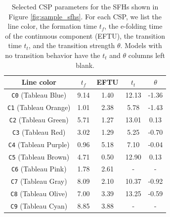 
\begin{table}
    \centering
    \begin{tabular}{||c|c|c|c|c||} \hline \hline
        Line color & $t_f$ & EFTU & $t_t$ & $\theta$ \\ \hline
        \textcolor{mplc0}{\texttt{C0}} (Tableau Blue) & 9.14 & 1.40 & 12.13 & -1.36 \\ \hline
        \textcolor{mplc1}{\texttt{C1}} (Tableau Orange) & 1.01 & 2.38 & 5.78 & -1.43 \\ \hline
        \textcolor{mplc2}{\texttt{C2}} (Tableau Green) & 5.71 & 1.27 & 13.01 & 0.13 \\ \hline
        \textcolor{mplc3}{\texttt{C3}} (Tableau Red) & 3.02 & 1.29 & 5.25 & -0.70 \\ \hline
        \textcolor{mplc4}{\texttt{C4}} (Tableau Purple) & 0.96 & 5.18 & 7.10 & -0.04 \\ \hline
        \textcolor{mplc5}{\texttt{C5}} (Tableau Brown) & 4.71 & 0.50 & 12.90 & 0.13 \\ \hline
        \textcolor{mplc6}{\texttt{C6}} (Tableau Pink) & 1.78 & 2.61 & - & - \\ \hline
        \textcolor{mplc7}{\texttt{C7}} (Tableau Gray) & 8.09 & 2.10 & 10.37 & -0.92 \\ \hline
        \textcolor{mplc8}{\texttt{C8}} (Tableau Olive) & 7.00 & 3.39 & 13.25 & -0.59 \\ \hline
        \textcolor{mplc9}{\texttt{C9}} (Tableau Cyan) & 8.85 & 3.88 & - & - \\ \hline
    \end{tabular}
    \caption[Selected parameters for ten sample SFHs]{\fixspacing Selected CSP parameters for the SFHs shown in Figure \ref{fig:sample_sfhs}. For each CSP, we list the line color, the formation time $t_f$, the e-folding time of the continuous component (EFTU), the transition time $t_t$, and the transition strength $\theta$. Models with no transition behavior have the $t_t$ and $\theta$ columns left blank.}
    \label{tab:sfh_params}
\end{table}

